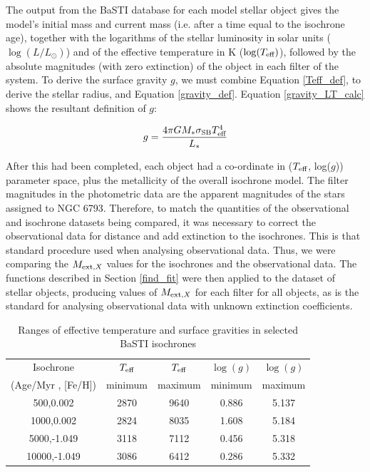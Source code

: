 \documentclass[12pt, a4paper]{report}
\begin{document}
The output from the BaSTI database for each model stellar object gives the model's initial mass and current mass (i.e. after a time equal to the isochrone age), together with the logarithms of the stellar luminosity in solar units ($\log(L/L_{\odot})$) and of the effective temperature in K ($\log(T_{\textnormal{eff}})$), followed by the absolute magnitudes (with zero extinction) of the object in each filter of the system. To derive the surface gravity $g$, we must combine Equation \ref{Teff_def}, to derive the stellar radius, and Equation \ref{gravity_def}. Equation \ref{gravity_LT_calc} shows the resultant definition of $g$:

\begin{equation}
\label{gravity_LT_calc}
g = \frac{4 \pi G M_{*} \sigma_{\textnormal{SB}} T_{\textnormal{eff}}^{4}}{L_{*}}
\end{equation}

After this had been completed, each object had a co-ordinate in ($T_{\textnormal{eff}}$, log($g$)) parameter space, plus the metallicity of the overall isochrone model. The filter magnitudes in the photometric data are the apparent magnitudes of the stars assigned to NGC 6793. Therefore, to match the quantities of the observational and isochrone datasets being compared, it was necessary to correct the observational data for distance and add extinction to the isochrones. This is that standard procedure used when analysing observational data. Thus, we were comparing the $M_{\textnormal{ext},X}$ values for the isochrones and the observational data. The functions described in Section \ref{find_fit} were then applied to the dataset of stellar objects, producing values of $M_{\textnormal{ext},X}$ for each filter for all objects, as is the standard for analysing observational data with unknown extinction coefficients.

\begin{table}
\begin{center}
\begin{tabular}{ccccc}
\hline
Isochrone & $T_{\textnormal{eff}}$ & $T_{\textnormal{eff}}$ & $\log(g)$ & $\log(g)$ \\
(Age/Myr , [Fe/H]) & minimum & maximum & minimum & maximum \\
\hline
500,0.002 & 2870 & 9640 & 0.886 & 5.137 \\
1000,0.002 & 2824 & 8035 & 1.608 & 5.184 \\
5000,-1.049 & 3118 & 7112 & 0.456 & 5.318 \\
10000,-1.049 & 3086 & 6412 & 0.286 & 5.332 \\
\hline
\end{tabular}
\caption{Ranges of effective temperature and surface gravities in selected BaSTI isochrones}
\label{variable_ranges}
\end{center}
\end{table}
\end{document}
